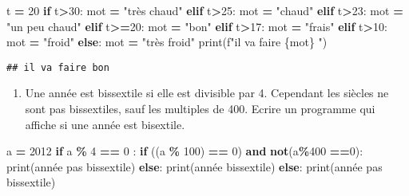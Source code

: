 \documentclass[
]{book}
\newenvironment{Shaded}{\begin{snugshade}}{\end{snugshade}}
\newcommand{\BuiltInTok}[1]{#1}
\newcommand{\ControlFlowTok}[1]{\textcolor[rgb]{0.13,0.29,0.53}{\textbf{#1}}}
\newcommand{\DecValTok}[1]{\textcolor[rgb]{0.00,0.00,0.81}{#1}}
\newcommand{\KeywordTok}[1]{\textcolor[rgb]{0.13,0.29,0.53}{\textbf{#1}}}
\newcommand{\NormalTok}[1]{#1}
\newcommand{\OperatorTok}[1]{\textcolor[rgb]{0.81,0.36,0.00}{\textbf{#1}}}
\newcommand{\SpecialCharTok}[1]{\textcolor[rgb]{0.00,0.00,0.00}{#1}}
\newcommand{\SpecialStringTok}[1]{\textcolor[rgb]{0.31,0.60,0.02}{#1}}
\newcommand{\StringTok}[1]{\textcolor[rgb]{0.31,0.60,0.02}{#1}}
\providecommand{\tightlist}{%
  \setlength{\itemsep}{0pt}\setlength{\parskip}{0pt}}
\def\tightlist{}
\begin{document}
\begin{Shaded}
\begin{Highlighting}[]
\NormalTok{t }\OperatorTok{=} \DecValTok{20}
\ControlFlowTok{if}\NormalTok{ t}\OperatorTok{\textgreater{}}\DecValTok{30}\NormalTok{:}
\NormalTok{    mot }\OperatorTok{=} \StringTok{"très chaud"}
\ControlFlowTok{elif}\NormalTok{ t}\OperatorTok{\textgreater{}}\DecValTok{25}\NormalTok{:}
\NormalTok{    mot }\OperatorTok{=} \StringTok{"chaud"}
\ControlFlowTok{elif}\NormalTok{ t}\OperatorTok{\textgreater{}}\DecValTok{23}\NormalTok{:}
\NormalTok{    mot }\OperatorTok{=} \StringTok{"un peu chaud"}
\ControlFlowTok{elif}\NormalTok{ t}\OperatorTok{\textgreater{}=}\DecValTok{20}\NormalTok{:}
\NormalTok{    mot }\OperatorTok{=} \StringTok{"bon"}
\ControlFlowTok{elif}\NormalTok{ t}\OperatorTok{\textgreater{}}\DecValTok{17}\NormalTok{:}
\NormalTok{    mot }\OperatorTok{=} \StringTok{"frais"}
\ControlFlowTok{elif}\NormalTok{ t}\OperatorTok{\textgreater{}}\DecValTok{10}\NormalTok{:}
\NormalTok{    mot }\OperatorTok{=} \StringTok{"froid"}
\ControlFlowTok{else}\NormalTok{:}
\NormalTok{    mot }\OperatorTok{=} \StringTok{"très froid"}
\BuiltInTok{print}\NormalTok{(}\SpecialStringTok{f"il va faire }\SpecialCharTok{\{}\NormalTok{mot}\SpecialCharTok{\}}\SpecialStringTok{ "}\NormalTok{)}
\end{Highlighting}
\end{Shaded}

\begin{verbatim}
## il va faire bon
\end{verbatim}

\begin{enumerate}
\def\labelenumi{\arabic{enumi}.}
\setcounter{enumi}{4}
\tightlist
\item
  Une année est bissextile si elle est divisible par 4. Cependant les siècles ne sont pas bissextiles, sauf les multiples de 400. Ecrire un programme qui affiche si une année est bisextile.
\end{enumerate}

\begin{Shaded}
\begin{Highlighting}[]
\NormalTok{a }\OperatorTok{=} \DecValTok{2012}
\ControlFlowTok{if}\NormalTok{ a }\OperatorTok{\%} \DecValTok{4} \OperatorTok{==} \DecValTok{0}\NormalTok{ :}
    \ControlFlowTok{if}\NormalTok{ ((a }\OperatorTok{\%} \DecValTok{100}\NormalTok{) }\OperatorTok{==} \DecValTok{0}\NormalTok{) }\KeywordTok{and} \KeywordTok{not}\NormalTok{(a}\OperatorTok{\%}\DecValTok{400} \OperatorTok{==}\DecValTok{0}\NormalTok{):}
        \BuiltInTok{print}\NormalTok{(}\StringTok{\textquotesingle{}année pas bissextile\textquotesingle{}}\NormalTok{)}
    \ControlFlowTok{else}\NormalTok{:}
        \BuiltInTok{print}\NormalTok{(}\StringTok{\textquotesingle{}année bissextile\textquotesingle{}}\NormalTok{)}
\ControlFlowTok{else}\NormalTok{:}
    \BuiltInTok{print}\NormalTok{(}\StringTok{\textquotesingle{}année pas bissextile\textquotesingle{}}\NormalTok{)}
\end{Highlighting}
\end{Shaded}
\end{document}
